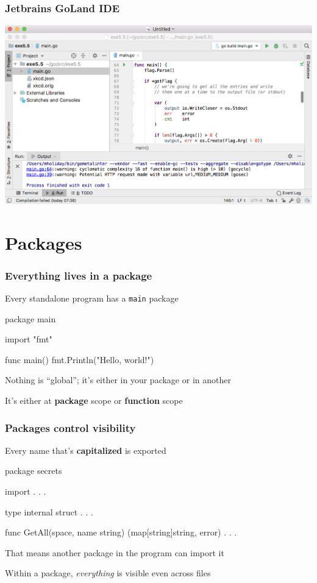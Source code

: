 \documentclass[handout,compress,t,11pt]{beamer}
\begin{document}
\begin{frame}[fragile]
    \frametitle{Jetbrains GoLand IDE}
    \begin{center}
    \includegraphics[width=\textwidth]{goland.png}
    \end{center}
\end{frame}


\section{Packages}
\begin{frame}[fragile]
\frametitle{Everything lives in a package}
Every standalone program has a \verb|main| package
\begin{golang}
package main

import "fmt"

func main() {
    fmt.Println("Hello, world!")
}
\end{golang}
\vspace{2\baselineskip}
Nothing is ``global''; it's either in your package or in another \par
\vspace{1\baselineskip}
It's either at  {\bf package} scope or {\bf function} scope
\end{frame}

\begin{frame}[fragile]
\frametitle{Packages control visibility}
Every name that's {\bf capitalized} is exported
\begin{golang}
package secrets

import . . .

type internal struct {
	. . .
}

func GetAll(space, name string) (map[string]string, error) {
	. . .
}
\end{golang}
\vspace{0.6\baselineskip}
That means another package in the program can import it \par
\vspace{0.4\baselineskip}
Within a package, {\em everything} is visible even across files
\end{frame}
\end{document}
